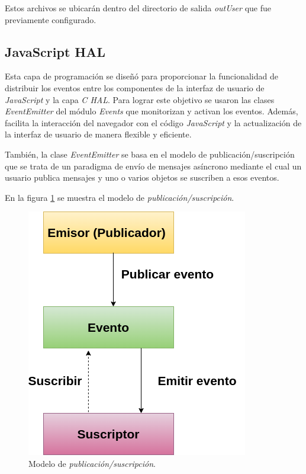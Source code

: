 Estos archivos se ubicarán dentro del directorio de salida  \textit{outUser} que fue previamente configurado.


\subsection{JavaScript HAL}

Esta capa de programación se diseñó para proporcionar la funcionalidad de distribuir los eventos entre los componentes de la interfaz de usuario de \textit{JavaScript} y la capa \textit{C HAL}. Para lograr este objetivo se usaron las clases \textit{EventEmitter} del módulo \textit{Events} que monitorizan y activan los eventos. Además, facilita la interacción del navegador con el código \textit{JavaScript} y la actualización de la interfaz de usuario de manera flexible y eficiente.

También, la clase \textit{EventEmitter} se basa en el modelo de publicación/suscripción que se trata de un paradigma de envío de mensajes asíncrono mediante el cual un usuario publica mensajes y uno o varios objetos se suscriben a esos eventos.

En la figura \ref{fig:PublicarSuscribir} se muestra el modelo de \textit{publicación/suscripción}.

\begin{figure}[ht]
	\centering
	\includegraphics[scale=.49]{./Figures/PublicarSuscribir.png}
	\caption{Modelo de \textit{publicación/suscripción}.}
	\label{fig:PublicarSuscribir}
\end{figure}


